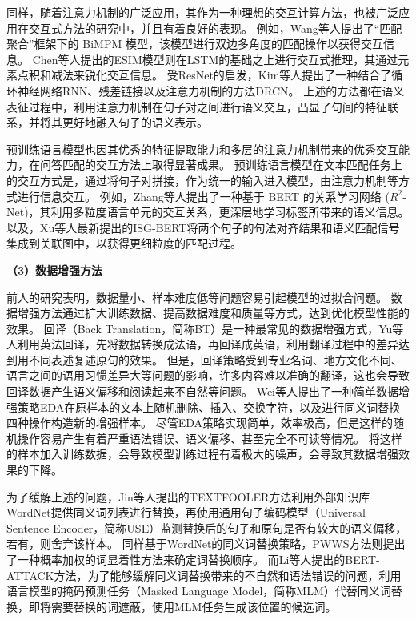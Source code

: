 同样，随着注意力机制的广泛应用，其作为一种理想的交互计算方法，也被广泛应用在交互式方法的研究中，并且有着良好的表现。
例如，Wang等人提出了“匹配-聚合”框架下的 BiMPM 模型\cite{wang2017bilateral}，该模型进行双边多角度的匹配操作以获得交互信息。 
Chen等人提出的ESIM\cite{chen-etal-2017-enhanced}模型则在LSTM的基础之上进行交互式推理，其通过元素点积和减法来锐化交互信息。
受ResNet\cite{he2016deep}的启发，Kim等人提出了一种结合了循环神经网络RNN、残差链接以及注意力机制的方法DRCN\cite{kim2019semantic}。
上述的方法都在语义表征过程中，利用注意力机制在句子对之间进行语义交互，凸显了句间的特征联系，并将其更好地融入句子的语义表示。

预训练语言模型也因其优秀的特征提取能力和多层的注意力机制带来的优秀交互能力，在问答匹配的交互方法上取得显著成果。
预训练语言模型在文本匹配任务上的交互方式是，通过将句子对拼接，作为统一的输入进入模型，由注意力机制等方式进行信息交互。
例如，Zhang等人提出了一种基于 BERT 的关系学习网络 ($R^2$-Net)\cite{zhang2021making}，其利用多粒度语言单元的交互关系，更深层地学习标签所带来的语义信息。
以及，Xu等人最新提出的ISG-BERT\cite{xu2022semantic}将两个句子的句法对齐结果和语义匹配信号集成到关联图中，以获得更细粒度的匹配过程。

\textbf{\songti （3）数据增强方法}

前人的研究表明，数据量小、样本难度低等问题容易引起模型的过拟合问题。
数据增强方法通过扩大训练数据、提高数据难度和质量等方式，达到优化模型性能的效果。
回译（Back Translation，简称BT）是一种最常见的数据增强方式，Yu等人\cite{yu2018qanet}利用英法回译，先将数据转换成法语，再回译成英语，利用翻译过程中的差异达到用不同表述复述原句的效果。
但是，回译策略受到专业名词、地方文化不同、语言之间的语用习惯差异大等问题的影响，许多内容难以准确的翻译，这也会导致回译数据产生语义偏移和阅读起来不自然等问题。
Wei等人提出了一种简单数据增强策略EDA\cite{wei2019eda}在原样本的文本上随机删除、插入、交换字符，以及进行同义词替换四种操作构造新的增强样本。
尽管EDA策略实现简单，效率极高，但是这样的随机操作容易产生有着严重语法错误、语义偏移、甚至完全不可读等情况。
将这样的样本加入训练数据，会导致模型训练过程有着极大的噪声，会导致其数据增强效果的下降。

为了缓解上述的问题，Jin等人提出的TEXTFOOLER\cite{jin2020bert}方法利用外部知识库WordNet提供同义词列表进行替换，再使用通用句子编码模型（Universal Sentence Encoder，简称USE）\cite{cer2018universal}监测替换后的句子和原句是否有较大的语义偏移，若有，则舍弃该样本。
同样基于WordNet的同义词替换策略，PWWS方法\cite{ren-etal-2019-generating}则提出了一种概率加权的词显着性方法来确定词替换顺序。
而Li等人提出的BERT-ATTACK\cite{li2020bert}方法，为了能够缓解同义词替换带来的不自然和语法错误的问题，利用语言模型的掩码预测任务（Masked Language Model，简称MLM）代替同义词替换，即将需要替换的词遮蔽，使用MLM任务生成该位置的候选词。

